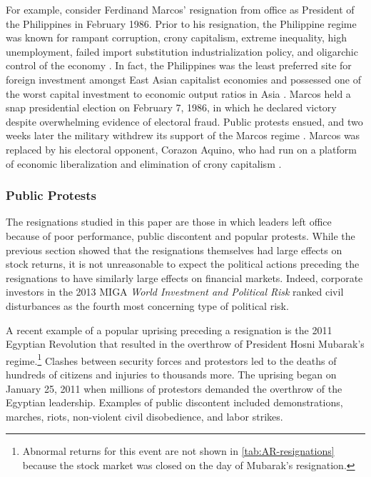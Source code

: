 \documentclass[12pt,final,fleqn]{article}
\theoremstyle{plain}
\begin{document}
For example, consider Ferdinand Marcos' resignation from office as President of the Philippines in February 1986. Prior to his resignation, the Philippine regime was known for rampant corruption, crony capitalism, extreme inequality, high unemployment, failed import substitution industrialization policy, and oligarchic control of the economy \citep{overholt1986rise, traywick2014}. In fact, the Philippines was the least preferred site for foreign investment amongst East Asian capitalist economies and possessed one of the worst capital investment to economic output ratios in Asia \citep{overholt1986rise}. Marcos held a snap presidential election on February 7, 1986, in which he declared victory despite overwhelming evidence of electoral fraud. Public protests ensued, and two weeks later the military withdrew its support of the Marcos regime \citep{lee2009armed}. Marcos was replaced by his electoral opponent, Corazon Aquino, who had run on a platform of economic liberalization and elimination of crony capitalism \citep{villegas1987philippines}. 

\subsubsection{Public Protests} \label{subsec: Public Protests}
The resignations studied in this paper are those in which leaders left office because of poor performance, public discontent and popular protests. While the previous section showed that the resignations themselves had large effects on stock returns, it is not unreasonable to expect the political actions preceding the resignations to have similarly large effects on financial markets. Indeed, corporate investors in the 2013 MIGA \textit{World Investment and Political Risk} ranked civil disturbances as the fourth most concerning type of political risk.

A recent example of a popular uprising preceding a resignation is the 2011 Egyptian Revolution that resulted in the overthrow of President Hosni Mubarak's regime.\footnote{Abnormal returns for this event are not shown in \autoref{tab:AR-resignations} because the stock market was closed on the day of Mubarak's resignation.} Clashes between security forces and protestors led to the deaths of hundreds of citizens and injuries to thousands more. The uprising began on January 25, 2011 when millions of protestors demanded the overthrow of the Egyptian leadership. Examples of public discontent included demonstrations, marches, riots, non-violent civil disobedience, and labor strikes.
\end{document}
